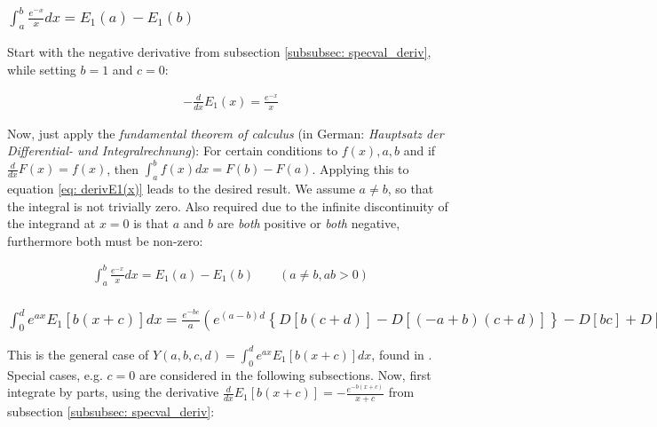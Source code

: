 \documentclass[bibliography=totocnumbered]{scrartcl}
\begin{document}
	\subsubsection[A definite integral having two exponential integrals as result]{$\int_{a}^{b}\frac{e^{-x}}{x}dx=E_1\left(a\right)-E_1\left(b\right)$}
	\label{subsubsec: definiteIntegral}
	
	Start with the negative derivative from subsection \ref{subsubsec: specval_deriv}, while setting $b=1$ and $c=0$:
	
	\begin{gather}
		-\frac{d}{dx}E_1\left(x\right)=\frac{e^{-x}}{x}\label{eq: derivE1(x)}
	\end{gather}
	
	Now, just apply the \emph{fundamental theorem of calculus} (in German: \emph{Hauptsatz der Differential- und Integralrechnung}): For certain conditions to $f\left(x\right), a, b$ and if $\frac{d}{dx}F\left(x\right)=f\left(x\right)$, then $\int_{a}^{b}f\left(x\right)dx=F\left(b\right)-F\left(a\right)$. Applying this to equation \eqref{eq: derivE1(x)} leads to the desired result. We assume $a\neq{}b$, so that the integral is not trivially zero. Also required due to the infinite discontinuity of the integrand at $x=0$ is that $a$ and $b$ are \emph{both} positive or \emph{both} negative, furthermore both must be non-zero:

	\begin{gather}
		\int_{a}^{b}\frac{e^{-x}}{x}dx=E_1\left(a\right)-E_1\left(b\right)\qquad\left(a\neq{}b, ab>0\right)
	\end{gather}
	
	\subsubsection[A integral of E1, involving the exponential function]{$\int_{0}^{d}e^{ax}E_1\left[b\left(x+c\right)\right]dx=\frac{e^{-bc}}{a}\left(e^{\left(a-b\right)d}\left\{D\left[b\left(c+d\right)\right]-D\left[\left(-a+b\right)\left(c+d\right)\right]\right\}-D\left[bc\right]+D\left[\left(-a+b\right)c\right]\right)$}
	\label{subsubsec: generalIntegralOfE1}
	
	This is the general case of $Y\left(a, b, c, d\right)=\int_{0}^{d}e^{ax}E_1\left[b\left(x+c\right)\right]dx$, found in \cite{boer1990calc}. Special cases, e.g. $c=0$ are considered in the following subsections. Now, first integrate by parts, using the derivative $\frac{d}{dx}E_1\left[b\left(x+c\right)\right]=-\frac{e^{-b\left(x+c\right)}}{x+c}$ from subsection \ref{subsubsec: specval_deriv}:
	
\end{document}
